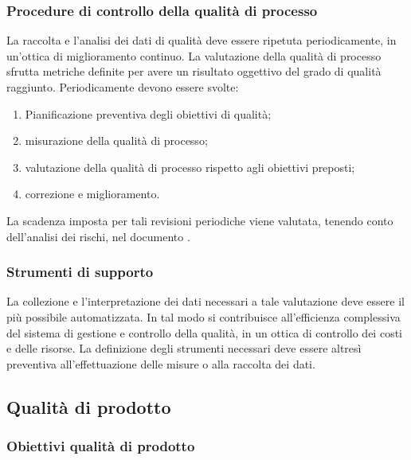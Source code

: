 \documentclass[12pt,a4paper]{article}
\begin{document}
\subsubsection{Procedure di controllo della qualità di processo}
La raccolta e l'analisi dei dati di qualità deve essere ripetuta periodicamente, in un'ottica di miglioramento continuo. La valutazione della qualità di processo sfrutta metriche  definite per avere un risultato oggettivo del grado di qualità raggiunto. Periodicamente devono essere svolte:
\begin{enumerate}
	\item Pianificazione preventiva degli obiettivi di qualità;
	\item misurazione della qualità di processo;
	\item valutazione della qualità di processo rispetto agli obiettivi preposti;
	\item correzione e miglioramento.
\end{enumerate}
La scadenza imposta per tali revisioni periodiche viene valutata, tenendo  conto dell'analisi dei rischi, nel documento \PdP{}.

\subsubsection{Strumenti di supporto}
La collezione e l'interpretazione dei dati necessari a tale valutazione deve essere il più possibile automatizzata. In tal modo si contribuisce all'efficienza complessiva del sistema di gestione e controllo della qualità, in un ottica di controllo dei costi e delle risorse. La definizione degli strumenti necessari deve essere altresì preventiva all'effettuazione delle misure o alla raccolta dei dati.

\subsection{Qualità di prodotto}

\subsubsection{Obiettivi qualità di prodotto}
\end{document}
